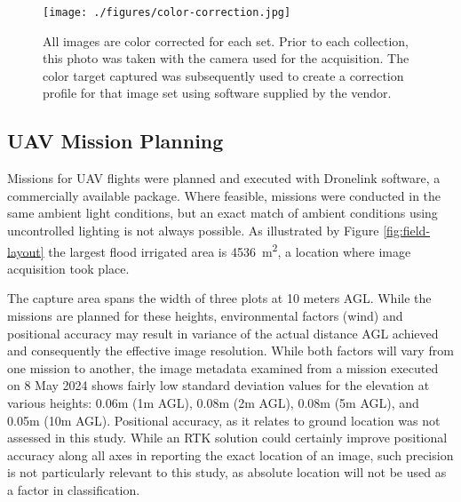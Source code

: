 \documentclass[letterpaper]{report}
\begin{document}
\begin{figure}[h!]
	\centering
	\texttt{[image: ./figures/color-correction.jpg]}
	\caption[Color correction target and image set identification]{All images are color corrected for each set. Prior to each collection, this photo was taken with the camera used for the acquisition. The color target captured was subsequently used to create a correction profile for that image set using software supplied by the vendor.}
	\label{fig:color-correction}
\end{figure}

\subsection{UAV Mission Planning}
Missions for UAV flights were planned and executed with Dronelink software, a commercially available package.  Where feasible, missions were conducted in the same ambient light conditions, but an exact match of ambient conditions using uncontrolled lighting is not always possible.
As illustrated by Figure \ref{fig:field-layout} the largest flood irrigated area is \SI{4536}{\metre\squared}, a location where image acquisition took place.  

%
The capture area spans the width of three plots at 10 meters AGL. While the missions are planned for these heights, environmental factors (wind) and positional accuracy may result in variance of the actual distance AGL achieved and consequently the effective image resolution. While both factors will vary from one mission to another, the image metadata examined from a mission executed on 8 May 2024 shows fairly low standard deviation values for the elevation  at various heights: 0.06m (1m AGL), 0.08m (2m AGL), 0.08m (5m AGL), and 0.05m (10m AGL). Positional accuracy, as it relates to ground location was not assessed in this study. While an RTK solution could certainly improve positional accuracy along all axes in reporting the exact location of an image, such precision is not particularly relevant to this study, as absolute location will not be used as a factor in classification.
\end{document}
